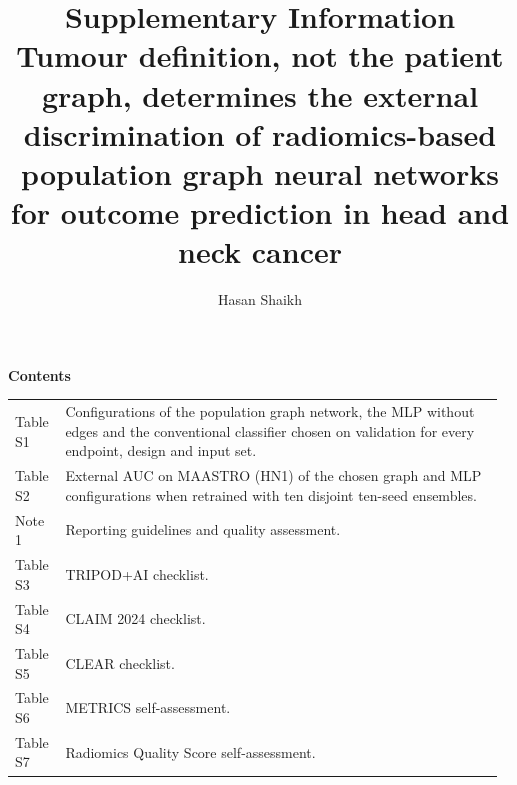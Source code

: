\documentclass[11pt,a4paper]{article}
\begin{document}
\title{\vspace{-1.2cm}\Large\textbf{Supplementary Information}\\[6pt]\large Tumour definition, not the patient graph, determines the external discrimination of radiomics-based population graph neural networks for outcome prediction in head and neck cancer}
\author{\normalsize Hasan Shaikh}
\date{}

\maketitle
\vspace{-0.4cm}
\noindent\textbf{Contents}\par\vspace{4pt}
\noindent\begin{tabular}{@{}p{0.1\linewidth}p{0.87\linewidth}@{}}
Table S1 & Configurations of the population graph network, the MLP without edges and the conventional classifier chosen on validation for every endpoint, design and input set.\\[4pt]
Table S2 & External AUC on MAASTRO (HN1) of the chosen graph and MLP configurations when retrained with ten disjoint ten-seed ensembles.\\[4pt]
Note 1 & Reporting guidelines and quality assessment.\\[4pt]
Table S3 & TRIPOD+AI checklist.\\[4pt]
Table S4 & CLAIM 2024 checklist.\\[4pt]
Table S5 & CLEAR checklist.\\[4pt]
Table S6 & METRICS self-assessment.\\[4pt]
Table S7 & Radiomics Quality Score self-assessment.\\
\end{tabular}

\clearpage


\begin{table}[H]
\centering
\caption{Configurations chosen on validation for every endpoint, design and input set, separately for the population graph network (best of GCN, GraphSAGE and GAT), the MLP without edges and the conventional classifier (logistic regression or random forest, RF). Features: original + shape (107) or all including Laplacian-of-Gaussian features (479); $k$: number of selected radiomic features; Graph: number of training neighbours per node; Val.\ AUC: validation AUC used for the choice.}\label{tab:configs}
\footnotesize

\end{table}

\begin{table}[H]
\centering
\caption{External AUC on MAASTRO of the chosen configurations when retrained with disjoint ten-seed ensembles (seeds from 1000 onwards). Reported: AUC of the model in Table~2 of the main text (seeds 0--9); SD, standard deviation over the re-runs; Above CNN: number of re-runs whose AUC exceeded that of the CNN.}\label{tab:seed}
\small

\end{table}

\clearpage
{\footnotesize
\setlength{\LTcapwidth}{\linewidth}
\renewcommand{\arraystretch}{1.12}

}
\end{document}
